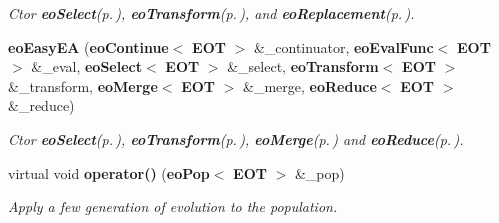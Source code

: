 \begin{CompactItemize}
\begin{CompactList}\small\item\em Ctor {\bf eo\-Select}{\rm (p.\,\pageref{classeo_select})}, {\bf eo\-Transform}{\rm (p.\,\pageref{classeo_transform})}, and {\bf eo\-Replacement}{\rm (p.\,\pageref{classeo_replacement})}. \item\end{CompactList}\item 
{\bf eo\-Easy\-EA} ({\bf eo\-Continue}$<$ {\bf EOT} $>$ \&\_\-continuator, {\bf eo\-Eval\-Func}$<$ {\bf EOT} $>$ \&\_\-eval, {\bf eo\-Select}$<$ {\bf EOT} $>$ \&\_\-select, {\bf eo\-Transform}$<$ {\bf EOT} $>$ \&\_\-transform, {\bf eo\-Merge}$<$ {\bf EOT} $>$ \&\_\-merge, {\bf eo\-Reduce}$<$ {\bf EOT} $>$ \&\_\-reduce)\label{classeo_easy_e_a_a4}

\begin{CompactList}\small\item\em Ctor {\bf eo\-Select}{\rm (p.\,\pageref{classeo_select})}, {\bf eo\-Transform}{\rm (p.\,\pageref{classeo_transform})}, {\bf eo\-Merge}{\rm (p.\,\pageref{classeo_merge})} and {\bf eo\-Reduce}{\rm (p.\,\pageref{classeo_reduce})}. \item\end{CompactList}\item 
virtual void {\bf operator()} ({\bf eo\-Pop}$<$ {\bf EOT} $>$ \&\_\-pop)\label{classeo_easy_e_a_a5}

\begin{CompactList}\small\item\em Apply a few generation of evolution to the population. \item\end{CompactList}\end{CompactItemize}
